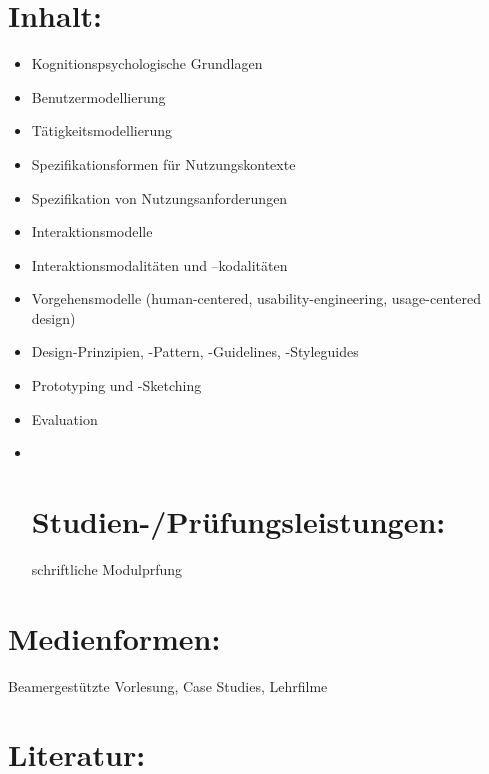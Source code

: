 \section{Inhalt:}\label{inhalt-15}

\begin{itemize}
\item
  Kognitionspsychologische Grundlagen
\item
  Benutzermodellierung
\item
  Tätigkeitsmodellierung
\item
  Spezifikationsformen für Nutzungskontexte
\item
  Spezifikation von Nutzungsanforderungen
\item
  Interaktionsmodelle
\item
  Interaktionsmodalitäten und --kodalitäten
\item
  Vorgehensmodelle (human-centered, usability-engineering,
  usage-centered design)
\item
  Design-Prinzipien, -Pattern, -Guidelines, -Styleguides
\item
  Prototyping und -Sketching
\item
  Evaluation
\item ~
  \section{Studien-/Prüfungsleistungen:}\label{studien-pruxfcfungsleistungen-15}

  schriftliche Modulprfung
\end{itemize}

\section{Medienformen:}\label{medienformen-15}

Beamergestützte Vorlesung, Case Studies, Lehrfilme

\section{Literatur:}\label{literatur-15}

